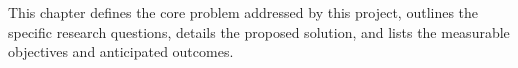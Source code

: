 This chapter defines the core problem addressed by this project, outlines the specific research questions, details the proposed solution, and lists the measurable objectives and anticipated outcomes.